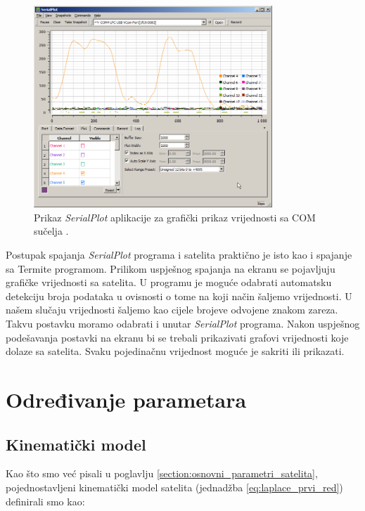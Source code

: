 \documentclass[times, utf8, diplomski, numeric]{templates/template}
\begin{document}
{{        \begin{figure}[htb]
        \centering
        \includegraphics[width=0.8\textwidth]{images/serialplot.png}
        \caption{Prikaz \emph{SerialPlot} aplikacije za grafički prikaz vrijednosti sa COM sučelja \cite{serialplot}.}
        \label{fig:serialplot}
        \end{figure}

        Postupak spajanja \emph{SerialPlot} programa i satelita praktično je isto kao i spajanje sa Termite programom. Prilikom uspješnog spajanja na ekranu se pojavljuju grafičke vrijednosti sa satelita. U programu je moguće odabrati automatsku detekciju broja podataka u ovisnosti o tome na koji način šaljemo vrijednosti. U našem slučaju vrijednosti šaljemo kao cijele brojeve odvojene znakom zareza. Takvu postavku moramo odabrati i unutar \emph{SerialPlot} programa. Nakon uspješnog podešavanja postavki na ekranu bi se trebali prikazivati grafovi vrijednosti koje dolaze sa satelita. Svaku pojedinačnu vrijednost moguće je sakriti ili prikazati. 
    }

    \section{Određivanje parametara}{
        \subsection{Kinematički model}{
        \label{subsection:kinematicki_model}
            Kao što smo već pisali u poglavlju \ref{section:osnovni_parametri_satelita}, pojednostavljeni kinematički model satelita (jednadžba \ref{eq:laplace_prvi_red}) definirali smo kao:

}}}
\end{document}
